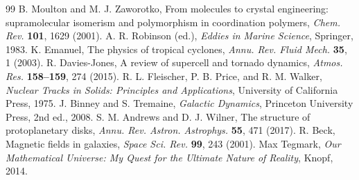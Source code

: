\documentclass[11pt,a4paper]{article}
\begin{document}
\begin{thebibliography}{99}
		B. Moulton and M. J. Zaworotko, From molecules to crystal engineering: supramolecular isomerism and polymorphism in coordination polymers, \emph{Chem. Rev.} \textbf{101}, 1629 (2001).
		A. R. Robinson (ed.), \emph{Eddies in Marine Science}, Springer, 1983.
		K. Emanuel, The physics of tropical cyclones, \emph{Annu. Rev. Fluid Mech.} \textbf{35}, 1 (2003).
		R. Davies-Jones, A review of supercell and tornado dynamics, \emph{Atmos. Res.} \textbf{158--159}, 274 (2015).
		R. L. Fleischer, P. B. Price, and R. M. Walker, \emph{Nuclear Tracks in Solids: Principles and Applications}, University of California Press, 1975.
		J. Binney and S. Tremaine, \emph{Galactic Dynamics}, Princeton University Press, 2nd ed., 2008.
		S. M. Andrews and D. J. Wilner, The structure of protoplanetary disks, \emph{Annu. Rev. Astron. Astrophys.} \textbf{55}, 471 (2017).
		R. Beck, Magnetic fields in galaxies, \emph{Space Sci. Rev.} \textbf{99}, 243 (2001).
		Max Tegmark, \emph{Our Mathematical Universe: My Quest for the Ultimate Nature of Reality}, Knopf, 2014.
	\end{thebibliography}
	
\end{document}
